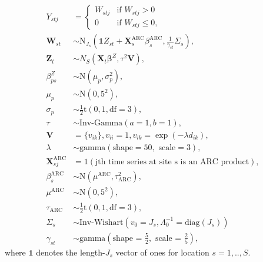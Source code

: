 \documentclass[12pt]{article}
\def\bbeta{\pmb{\beta}}
\def\bX{\pmb{X}}
\def\bZ{\pmb{Z}}
\def\bV{\pmb{V}}
\def\bW{\pmb{W}}
\begin{document}
\begin{align}
Y_{stj} &= \begin{cases} W_{stj} &\mbox{if } W_{stj} > 0 \\
0  &\mbox{if } W_{stj} \leq 0, \end{cases} \\
\bW_{st} &\sim \text{N}_{J_s}(\mathbf{1}Z_{st} + \bX^\text{ARC}_s \beta^\text{ARC}_s, \frac{1}{\gamma_{st}}\Sigma_s), \\
\bZ_t &\sim N_S(\bX_t \bbeta^Z, \tau^2\bV), \\
\beta_{ps}^Z &\sim \text{N}(\mu_p, \sigma^2_p), \\
\mu_{p} &\sim \text{N}(0, 5^2), \\
\sigma_{p} &\sim \frac{1}{2}\text{t}(0, 1, \text{df} = 3), \\
\tau &\sim \text{Inv-Gamma}(a = 1, b = 1), \\
\bV &= \{v_{ik}\}, v_{ii}=1, v_{ik} = \exp(-\lambda d_{ik}), \\
\lambda &\sim \text{gamma}(\text{shape} = 50, \text{ scale} = 3), \\
\bX^\text{ARC}_{sj} &= 1(\text{jth time series at site s is an ARC product}), \\
\beta^\text{ARC}_s &\sim \text{N}(\mu^\text{ARC}, \tau^2_\text{ARC}), \\
\mu^\text{ARC} &\sim \text{N}(0, 5^2), \\
\tau_\text{ARC} &\sim \frac{1}{2}\text{t}(0, 1, \text{df} = 3), \\
\Sigma_s &\sim \text{Inv-Wishart}(v_0 = J_s, \Lambda_0^{-1} = \text{diag}(J_s)) \\
\gamma_{st} &\sim \text{gamma}(\text{shape = } \frac{5}{2}, \text{ scale = } \frac{2}{5}),
\end{align}
where $\mathbf{1}$ denotes the length-$J_s$ vector of ones for location $s = 1, .., S$.
\end{document}
